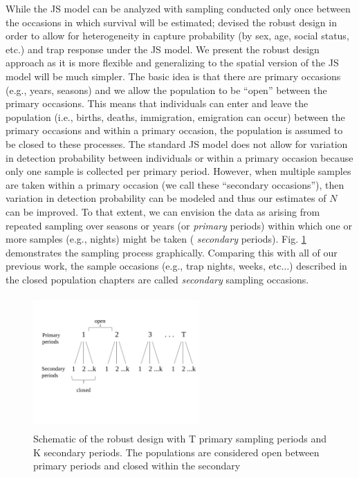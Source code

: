 While the JS model can be analyzed with sampling conducted only once
between the occasions in which survival will be estimated;
\citet{pollock:1982} devised
 the robust design in order to allow for
heterogeneity in capture probability (by sex, age, social status, etc.) and
trap response under the JS model.  
We present
the robust design approach as it is more flexible and generalizing to
the spatial version of the JS model will be much simpler.  The basic
idea is that there are primary occasions (e.g., years, seasons) and we
allow the population to be ``open'' between the primary occasions.
This means that individuals can enter and leave the population (i.e.,
births, deaths, immigration, emigration can occur) between the primary
occasions and within a primary occasion, the population is assumed to
be closed to these processes.  The standard JS model does not allow
for variation in detection probability between individuals or within a
primary occasion because only one sample is collected per primary
period.  However, when multiple samples are taken within a primary
occasion (we call these ``secondary occasions''), then variation in
detection probability can be modeled and thus our estimates of $N$ can
be improved.  To that extent, we can envision the data as arising from
repeated sampling over seasons or years (or {\it primary} periods)
within which one or more samples (e.g., nights) might be taken ({\it
  secondary} periods). Fig. \ref{open.figs.robustdesign} demonstrates
the sampling process graphically.  Comparing this with all of our
previous work, the sample occasions %
(e.g., trap nights, weeks, etc$\dots$) described in the closed
population chapters are called {\it secondary} sampling occasions.



\begin{figure}[h]
\centering
\includegraphics[height=2in,width=2.5in]{Ch16-Open/figs/RobustDesign.pdf}
\caption{Schematic of the robust design with T primary sampling periods and K secondary periods. The populations
are considered open between primary periods and closed within the secondary}
\label{open.figs.robustdesign}
\end{figure}

